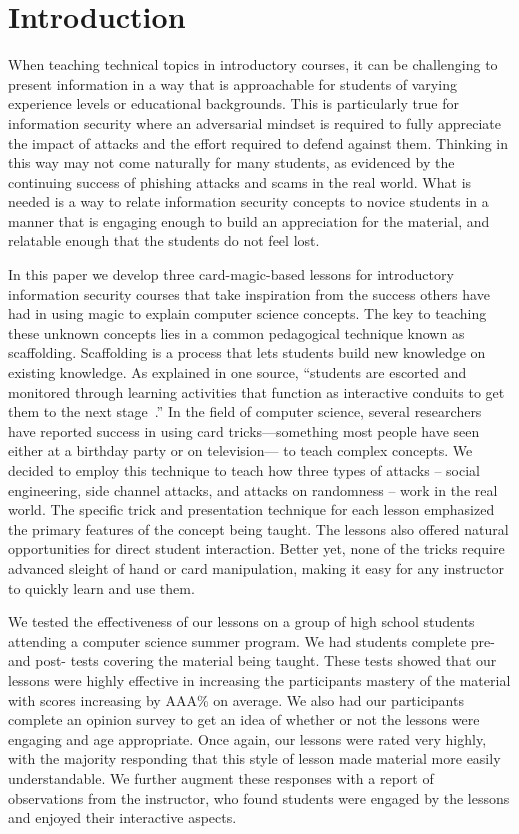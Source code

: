 \section{Introduction}
\label{SEC:introduction}

When teaching technical topics
in introductory courses,
it can be challenging
to present information
in a way that is approachable
for students of varying
experience levels
or educational backgrounds.
This is particularly true
for information security
where an adversarial mindset
is required
to fully appreciate the impact of attacks and the effort required to
defend against them.
Thinking in this way
may not come naturally
for many students,
as evidenced
by the continuing success of phishing attacks
and scams in the real world.
What is needed
is a way
to relate information security concepts
to novice students
in a manner
that is engaging enough
to build an appreciation for the material,
and relatable enough that the students do not feel lost.

In this paper
we develop three card-magic-based lessons
for introductory information security courses
that take inspiration
from the success others have had
in using magic
to explain computer science concepts.
The key to teaching these unknown concepts
lies in a common pedagogical technique
known as scaffolding.
Scaffolding is a process that lets students build
new knowledge on existing knowledge.
As explained in one source,
``students are escorted and monitored through learning
activities that function as interactive conduits to get
them to the next stage~\cite{raymond2000}.''
In the field of computer science,
several researchers have reported success in using card
tricks—something most people
have seen either at a birthday party
or on television— to teach complex concepts.
We decided to employ this technique to teach how three types
of attacks -- social engineering, side channel attacks, and attacks on
randomness -- work in the real world.
The specific trick and presentation technique
for each lesson emphasized the primary
features of the concept being taught.
The lessons also offered natural opportunities
for direct student interaction.
Better yet, none of the tricks require advanced sleight of hand
or card manipulation,
making it easy for any instructor to quickly learn and use them.


We tested the effectiveness of our lessons on
a group of high school students
attending a computer science summer program.
We had students complete pre- and post- tests covering the
material being taught.  These tests showed that our lessons were highly
effective in increasing the participants mastery of the material with scores
increasing by AAA\% on average.
We also had our participants complete an opinion survey to get an idea of
whether or not the lessons were engaging and age appropriate.  Once again, our
lessons were rated very highly,
with the majority responding that this style of lesson made material
more easily understandable.
We further augment these responses
with a report of observations
from the instructor,
who found students were engaged by the lessons and enjoyed their interactive
aspects.


